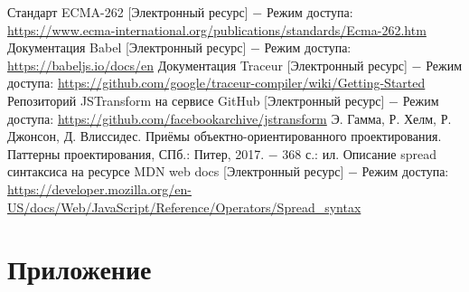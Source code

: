 \documentclass[14pt, a4paper]{article}
\begin{document}
\pagebreak

\begin{thebibliography}{9}
   Стандарт ECMA-262 [Электронный ресурс] $-$ Режим доступа: \linebreak
  \url{https://www.ecma-international.org/publications/standards/Ecma-262.htm}
   Документация Babel [Электронный ресурс] $-$ Режим доступа: \linebreak
  \url{https://babeljs.io/docs/en}
   Документация Traceur [Электронный ресурс] $-$ Режим доступа: \linebreak
  \url{https://github.com/google/traceur-compiler/wiki/Getting-Started}
   Репозиторий JSTransform на сервисе GitHub [Электронный ресурс] $-$ Режим доступа:
  \url{https://github.com/facebookarchive/jstransform}
   Э. Гамма, Р. Хелм, Р. Джонсон, Д. Влиссидес. Приёмы объектно-ориентированного проектирования. Паттерны проектирования, СПб.: Питер, 2017. $-$ 368 с.: ил.
   Описание spread синтаксиса на ресурсе MDN web docs [Электронный ресурс] $-$ Режим доступа:
  \url{https://developer.mozilla.org/en-US/docs/Web/JavaScript/Reference/Operators/Spread_syntax}
\end{thebibliography}

\pagebreak
{}
\section*{Приложение}

\end{document}
